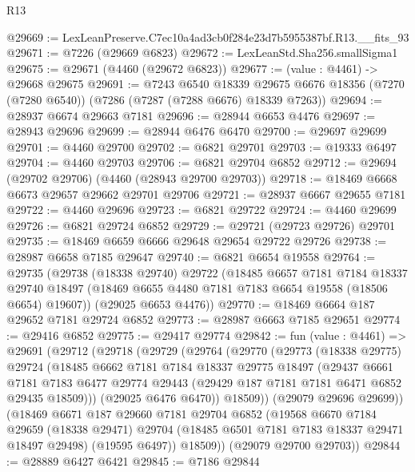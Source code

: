 \begin{lexlean}{R13}
\begin{coremodule}
@29669 := LexLeanPreserve.C7ec10a4ad3cb0f284e23d7b5955387bf.R13.__fits_93
@29671 := @7226 (@29669 @6823)
@29672 := LexLeanStd.Sha256.smallSigma1
@29675 := @29671 (@4460 (@29672 @6823))
@29677 := (value : @4461) -> @29668 @29675
@29691 := @7243
    @6540
    @18339
    @29675
    @6676
    @18356
    (@7270 (@7280 @6540))
    (@7286 (@7287 (@7288 @6676) @18339 @7263))
@29694 := @28937 @6674 @29663 @7181
@29696 := @28944 @6653 @4476
@29697 := @28943 @29696
@29699 := @28944 @6476 @6470
@29700 := @29697 @29699
@29701 := @4460 @29700
@29702 := @6821 @29701
@29703 := @19333 @6497
@29704 := @4460 @29703
@29706 := @6821 @29704 @6852
@29712 := @29694 (@29702 @29706) (@4460 (@28943 @29700 @29703))
@29718 := @18469 @6668 @6673 @29657 @29662 @29701 @29706
@29721 := @28937 @6667 @29655 @7181
@29722 := @4460 @29696
@29723 := @6821 @29722
@29724 := @4460 @29699
@29726 := @6821 @29724 @6852
@29729 := @29721 (@29723 @29726) @29701
@29735 := @18469 @6659 @6666 @29648 @29654 @29722 @29726
@29738 := @28987 @6658 @7185 @29647
@29740 := @6821 @6654 @19558
@29764 := @29735
    (@29738
      (@18338 @29740)
      @29722
      (@18485
        @6657
        @7181
        @7184
        @18337
        @29740
        @18497
        (@18469 @6655 @4480 @7181 @7183 @6654 @19558 (@18506 @6654) @19607))
      (@29025 @6653 @4476))
@29770 := @18469 @6664 @187 @29652 @7181 @29724 @6852
@29773 := @28987 @6663 @7185 @29651
@29774 := @29416 @6852
@29775 := @29417 @29774
@29842 := fun (value : @4461) =>
  @29691
    (@29712
      (@29718
        (@29729
          (@29764
            (@29770
              (@29773
                (@18338 @29775)
                @29724
                (@18485
                  @6662
                  @7181
                  @7184
                  @18337
                  @29775
                  @18497
                  (@29437
                    @6661
                    @7181
                    @7183
                    @6477
                    @29774
                    @29443
                    (@29429 @187 @7181 @7181 @6471 @6852 @29435 @18509)))
                (@29025 @6476 @6470))
              @18509))
          (@29079 @29696 @29699))
        (@18469
          @6671
          @187
          @29660
          @7181
          @29704
          @6852
          (@19568
            @6670
            @7184
            @29659
            (@18338 @29471)
            @29704
            (@18485 @6501 @7181 @7183 @18337 @29471 @18497 @29498)
            (@19595 @6497))
          @18509))
      (@29079 @29700 @29703))
@29844 := @28889 @6427 @6421
@29845 := @7186 @29844

\end{coremodule}
\end{lexlean}
